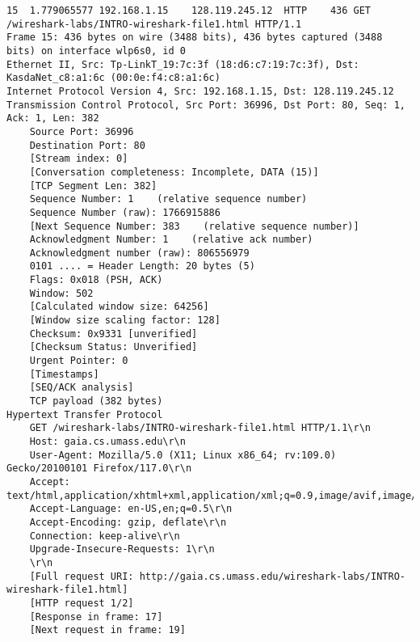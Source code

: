 \documentclass[12pt]{article}
\begin{document}
{\fontsize{3.3mm}{3.3mm}\selectfont
\begin{verbatim}
15	1.779065577	192.168.1.15	128.119.245.12	HTTP	436	GET /wireshark-labs/INTRO-wireshark-file1.html HTTP/1.1
Frame 15: 436 bytes on wire (3488 bits), 436 bytes captured (3488 bits) on interface wlp6s0, id 0
Ethernet II, Src: Tp-LinkT_19:7c:3f (18:d6:c7:19:7c:3f), Dst: KasdaNet_c8:a1:6c (00:0e:f4:c8:a1:6c)
Internet Protocol Version 4, Src: 192.168.1.15, Dst: 128.119.245.12
Transmission Control Protocol, Src Port: 36996, Dst Port: 80, Seq: 1, Ack: 1, Len: 382
    Source Port: 36996
    Destination Port: 80
    [Stream index: 0]
    [Conversation completeness: Incomplete, DATA (15)]
    [TCP Segment Len: 382]
    Sequence Number: 1    (relative sequence number)
    Sequence Number (raw): 1766915886
    [Next Sequence Number: 383    (relative sequence number)]
    Acknowledgment Number: 1    (relative ack number)
    Acknowledgment number (raw): 806556979
    0101 .... = Header Length: 20 bytes (5)
    Flags: 0x018 (PSH, ACK)
    Window: 502
    [Calculated window size: 64256]
    [Window size scaling factor: 128]
    Checksum: 0x9331 [unverified]
    [Checksum Status: Unverified]
    Urgent Pointer: 0
    [Timestamps]
    [SEQ/ACK analysis]
    TCP payload (382 bytes)
Hypertext Transfer Protocol
    GET /wireshark-labs/INTRO-wireshark-file1.html HTTP/1.1\r\n
    Host: gaia.cs.umass.edu\r\n
    User-Agent: Mozilla/5.0 (X11; Linux x86_64; rv:109.0) Gecko/20100101 Firefox/117.0\r\n
    Accept: text/html,application/xhtml+xml,application/xml;q=0.9,image/avif,image/webp,*/*;q=0.8\r\n
    Accept-Language: en-US,en;q=0.5\r\n
    Accept-Encoding: gzip, deflate\r\n
    Connection: keep-alive\r\n
    Upgrade-Insecure-Requests: 1\r\n
    \r\n
    [Full request URI: http://gaia.cs.umass.edu/wireshark-labs/INTRO-wireshark-file1.html]
    [HTTP request 1/2]
    [Response in frame: 17]
    [Next request in frame: 19]
\end{verbatim}}
\end{document}

